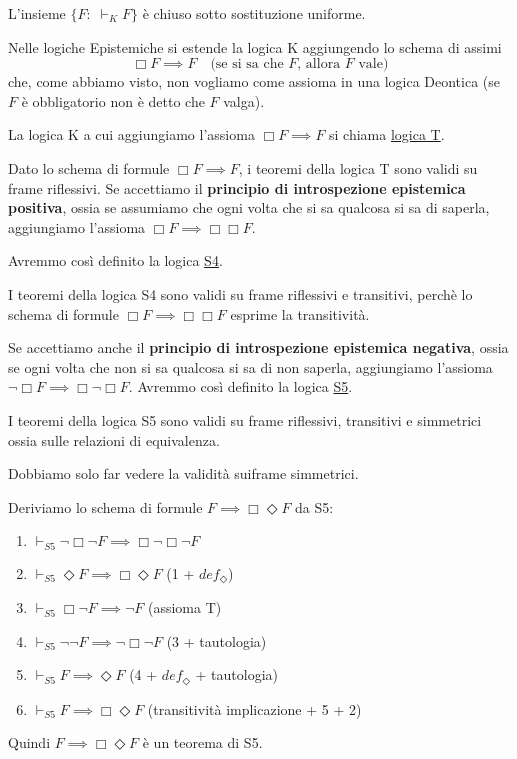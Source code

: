 \documentclass[../main.tex]{subfiles}
\begin{document}
\begin{theorem}
    L'insieme $\{F : \; \vdash_K F\}$ è chiuso sotto sostituzione uniforme.
\end{theorem}

Nelle logiche Epistemiche si estende la logica K aggiungendo lo schema di assimi
\begin{equation*}
    \Box F \implies F \quad \text{(se si sa che $F$, allora $F$ vale)}
\end{equation*}
che, come abbiamo visto, non vogliamo come assioma in una logica Deontica (se $F$ è obbligatorio non è detto che $F$ valga).

La logica K a cui aggiungiamo l'assioma $\Box F \implies F$ si chiama \underline{logica T}.

Dato lo schema di formule $\Box F \implies F$, i teoremi della logica T sono validi su frame riflessivi.
Se accettiamo il \textbf{principio di introspezione epistemica positiva}, ossia se assumiamo che ogni volta che si sa qualcosa si sa di saperla, aggiungiamo l'assioma $\Box F \implies \Box \Box F$.

Avremmo così definito la logica \underline{S4}.

I teoremi della logica S4 sono validi su frame riflessivi e transitivi, perchè lo schema di formule $\Box F \implies \Box \Box F$ esprime la transitività.

Se accettiamo anche il \textbf{principio di introspezione epistemica negativa}, ossia se ogni volta che non si sa qualcosa si sa di non saperla, aggiungiamo l'assioma $\neg \Box F \implies \Box \neg \Box F$.
Avremmo così definito la logica \underline{S5}.

I teoremi della logica S5 sono validi su frame riflessivi, transitivi e simmetrici ossia sulle relazioni di equivalenza.

Dobbiamo solo far vedere la validità suiframe simmetrici.

Deriviamo lo schema di formule $F \implies \Box \Diamond F$ da S5:
\begin{enumerate}[label=\arabic*)]
    \item $\vdash_{S5} \neg \Box \neg F \implies \Box \neg \Box \neg F$
    \item $\vdash_{S5} \Diamond F \implies \Box \Diamond F$ (1 + $def_\Diamond$)
    \item $\vdash_{S5} \Box \neg F \implies \neg F$ (assioma T)
    \item $\vdash_{S5} \neg \neg F \implies \neg \Box \neg F$ (3 + tautologia)
    \item $\vdash_{S5} F \implies \Diamond F$ (4 + $def_\Diamond$ + tautologia)
    \item $\vdash_{S5} F \implies \Box \Diamond F$ (transitività implicazione + 5 + 2)
\end{enumerate}
Quindi $F \implies \Box \Diamond F$ è un teorema di S5.
\end{document}
